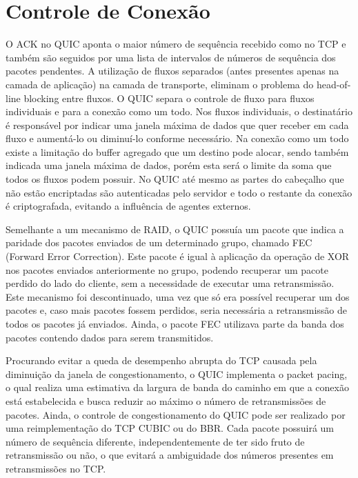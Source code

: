 \documentclass{article}
\begin{document}
\section{Controle de Conexão}

O ACK no QUIC aponta o maior número de sequência recebido como no TCP e também são seguidos por uma lista de intervalos
de números de sequência dos pacotes pendentes. A utilização de fluxos separados (antes presentes apenas na camada de
aplicação) na camada de transporte, eliminam o problema do head-of-line blocking entre fluxos. O QUIC separa o controle
de fluxo para fluxos individuais e para a conexão como um todo. Nos fluxos individuais, o destinatário é responsável por
indicar uma janela máxima de dados que quer receber em cada fluxo e aumentá-lo ou diminuí-lo conforme necessário. Na
conexão como um todo existe a limitação do buffer agregado que um destino pode alocar, sendo também indicada uma janela
máxima de dados, porém esta será o limite da soma que todos os fluxos podem possuir. No QUIC até mesmo as partes do
cabeçalho que não estão encriptadas são autenticadas pelo servidor e todo o restante da conexão é criptografada,
evitando a influência de agentes externos.

Semelhante a um mecanismo de RAID, o QUIC possuía um pacote que indica a paridade dos pacotes enviados de um determinado
grupo, chamado FEC (Forward Error Correction). Este pacote é igual à aplicação da operação de XOR nos pacotes enviados
anteriormente no grupo, podendo recuperar um pacote perdido do lado do cliente, sem a necessidade de executar uma
retransmissão. Este mecanismo foi descontinuado, uma vez que só era possível recuperar um dos pacotes e, caso mais
pacotes fossem perdidos, seria necessária a retransmissão de todos os pacotes já enviados. Ainda, o pacote FEC utilizava
parte da banda dos pacotes contendo dados para serem transmitidos.

Procurando evitar a queda de desempenho abrupta do TCP causada pela diminuição da janela de congestionamento, o QUIC
implementa o packet pacing, o qual realiza uma estimativa da largura de banda do caminho em que a conexão está
estabelecida e busca reduzir ao máximo o número de retransmissões de pacotes. Ainda, o controle de congestionamento do
QUIC pode ser realizado por uma reimplementação do TCP CUBIC ou do BBR. Cada pacote possuirá um número de sequência
diferente, independentemente de ter sido fruto de retransmissão ou não, o que evitará a ambiguidade dos números
presentes em retransmissões no TCP.
\end{document}
